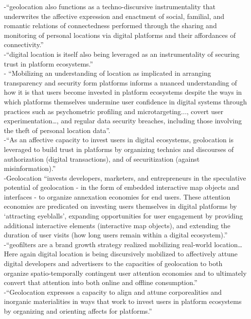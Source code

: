 -{\color{orange}“geolocation also functions as a techno-discursive instrumentality that underwrites the affective expression and enactment of social, familial, and romantic relations of connectedness performed through the sharing and monitoring of personal locations via digital platforms and their affordances of connectivity.”\cite{Leszczynski2019}}\\
-{\color{orange}“digital location is itself also being leveraged as an instrumentality of securing trust in platform ecosystems.”\cite{Leszczynski2019}}\\
-{\color{orange} “Mobilizing an understanding of location as implicated in arranging transparency and security form platforms informs a nuanced understanding of how it is that users become invested in platform ecosystems despite the ways in which platforms themselves undermine user confidence in digital systems through practices such as psychometric profiling and microtargeting..., covert user experimentation…, and regular data security breaches, including those involving the theft of personal location data”.\cite{Leszczynski2019}}\\
-{\color{orange}“As an affective capacity to invest users in digital ecosystems, geolocation is leveraged to build trust in platforms by organizing technics and discourses of authorization (digital transactions), and of securitization (against misinformation).”\cite{Leszczynski2019}}\\
-{\color{orange}Geolocation “invests developers, marketers, and entrepreneurs in the speculative potential of geolocation - in the form of embedded interactive map objects and interfaces - to organize annexation economies for end users. These attention economies are predicated on investing users themselves in digital platforms by ‘attracting eyeblalls’, expanding opportunities for user engagement by providing additional interactive elements (interactive map objects), and extending the duration of user visits (how long users remain within a digital ecosystem).”\cite{Leszczynski2019}}\\
-{\color{orange}“geofilters are a brand growth strategy realized mobilizing real-world location… Here again digital location is being discursively mobilized to affectively attune digital developers and advertisers to the capacities of geolocation to both organize spatio-temporally contingent user attention economies and to ultimately convert that attention into both online and offline consumption.”\cite{Leszczynski2019}}\\
-{\color{orange}“Geolocation expresses a capacity to align and attune corporealities and inorganic materialities in ways that work to invest users in platform ecosystems by organizing and orienting affects for platforms.”\cite{Leszczynski2019}}\\
